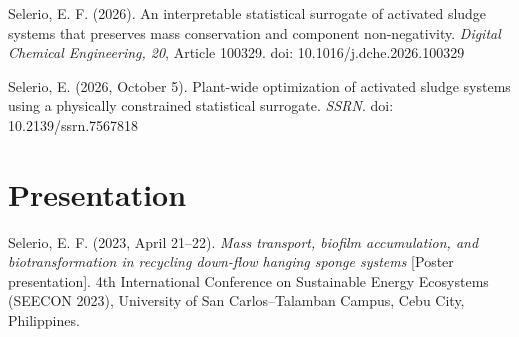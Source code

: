 \documentclass[12pt,twoside]{book}
\begin{document}
Selerio, E. F. (2026). An interpretable statistical surrogate of activated sludge systems that preserves mass
conservation and component non-negativity. \textit{Digital Chemical Engineering, 20}, Article 100329.
doi: 10.1016/j.dche.2026.100329

Selerio, E. (2026, October 5). Plant-wide optimization of activated sludge systems using a physically constrained statistical surrogate. \textit{SSRN}. doi: 10.2139/ssrn.7567818

\section*{Presentation}

Selerio, E. F. (2023, April 21--22). \textit{Mass transport, biofilm accumulation, and biotransformation in
recycling down-flow hanging sponge systems} [Poster presentation]. 4th International Conference on Sustainable
Energy Ecosystems (SEECON 2023), University of San Carlos--Talamban Campus, Cebu City, Philippines.
\end{document}
